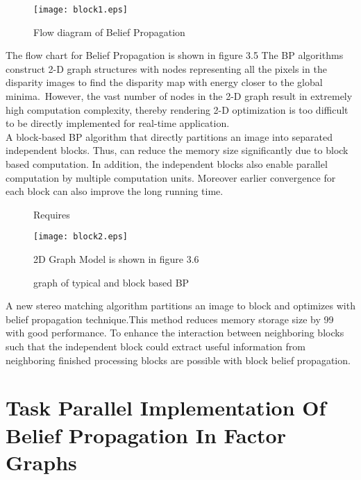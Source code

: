 \begin{figure}
  \texttt{[image: block1.eps]}\\
  \caption{Flow diagram of Belief Propagation}\label{}
\end{figure}
The flow chart  for Belief Propagation is shown in figure 3.5
 The BP algorithms construct 2-D graph structures with nodes representing all the pixels in the disparity images to find the disparity map with energy closer to the global minima.\ However, the vast number of nodes in the 2-D graph  result in  extremely high computation complexity, thereby rendering 2-D optimization is too difficult to be directly implemented for real-time application.\\
A block-based BP algorithm that directly partitions an image into separated independent blocks. Thus, can reduce the memory size significantly due to block based computation. In addition, the independent blocks also enable parallel computation by multiple computation units. Moreover earlier convergence for each block can also improve the long running time.


\begin{figure}
   Requires \usepackage{graphicx}
 \texttt{[image: block2.eps]}\\
  \caption{graph of typical and block based BP}\label{}
2D Graph Model is shown in figure 3.6
\end{figure}

A new stereo matching algorithm partitions an image to block and optimizes with belief propagation technique.This method reduces memory storage size by 99
with good performance.
 To enhance the interaction  between neighboring blocks such that the independent block could extract useful information from  neighboring finished processing blocks are possible with block belief propagation.
\section{Task Parallel Implementation Of Belief Propagation In Factor Graphs}

